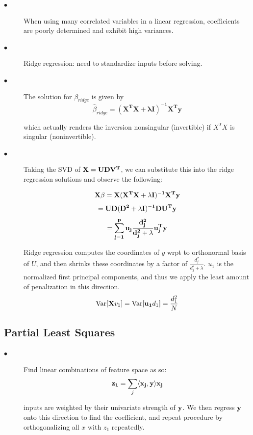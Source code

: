 \documentclass{article}
\begin{document}
\begin{description}

  \item[$\bullet$] When using many correlated variables in a linear regression, coefficients are poorly determined and exhibit high variances.
  
  \item[$\bullet$] Ridge regression: need to standardize inputs before solving.
  
  \item[$\bullet$] The solution for $\beta_{ridge}$ is given by
  \[\hat{\beta}_{ridge} = \mathbf{(X^TX + \lambda I)^{-1}X^Ty}\]
  
  which actually renders the inversion nonsingular (invertible) if $X^TX$ is singular (noninvertible).
  
  \item[$\bullet$] Taking the SVD of $\bold{X = UDV^T}$, we can substitute this into the ridge regression solutions and observe the following:
  
  \[\bold{X}\beta = \bold{X(X^TX + \lambda I)^{-1}X^Ty}\]
  \[= \bold{UD(D^2 + \lambda I)^{-1}DU^Ty}\]
  \[= \bold{\sum_{j=1}^p u_j\frac{d_j^2}{d_j^2+\lambda}u_j^Ty}\]
  
  Ridge regression computes the coordinates of $y$ wrpt to orthonormal basis of $U$, and then shrinks these coordinates by a factor of $\frac{d_j^2}{d_j^2 + \lambda}$. $u_1$ is the normalized first principal components, and thus we apply the least amount of penalization in this direction.
  \[\text{Var}[\bold{X}v_1] = \text{Var}[\bold{u_1}d_1] = \frac{d_1^2}{N}\]
    
\end{description}

\subsection{Partial Least Squares}

\begin{description}

  \item[$\bullet$] Find linear combinations of feature space as so:
  \[\bold{z_1} = \sum_j \langle \bold{x_j}, \bold{y}\rangle\bold{x_j}\]
  
  inputs are weighted by their univariate strength of $\bold{y}$. We then regress $\bold{y}$ onto this direction to find the coefficient, and repeat procedure by orthogonalizing all $x$ with $z_1$ repeatedly.
\end{description}
\end{document}
